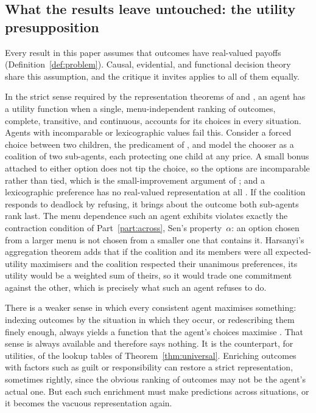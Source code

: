 \subsection{What the results leave untouched: the utility presupposition}\label{sec:disc-utility}

Every result in this paper assumes that outcomes have real-valued payoffs
(Definition~\ref{def:problem}). Causal, evidential, and functional decision theory share this
assumption, and the critique it invites applies to all of them equally.

In the strict sense required by the representation theorems of \textcite{vonneumannmorgenstern1944}
and \textcite{savage1954}, an agent has a utility function when a single, menu-independent ranking of
outcomes, complete, transitive, and continuous, accounts for its choices in every situation. Agents
with incomparable or lexicographic values fail this. Consider a forced choice between two children,
the predicament of \textcite{styron1979}, and model the chooser as a coalition of two sub-agents, each
protecting one child at any price. A small bonus attached to either option does not tip the choice,
so the options are incomparable rather than tied, which is the small-improvement argument of
\textcite{chang2002}; and a lexicographic preference has no real-valued representation at all
\autocite[159, with n.~1 on p.~164]{debreu1954}. If the coalition responds to deadlock by refusing, it brings about the outcome
both sub-agents rank last. The menu dependence such an agent exhibits violates exactly the contraction
condition  of Part~\ref{part:across}, Sen's property~$\alpha$: an option chosen from a larger
menu is not chosen from a smaller one that contains it. Harsanyi's aggregation theorem
\autocite[§III]{harsanyi1955} adds that if the coalition and its members were all expected-utility
maximisers and the coalition respected their unanimous preferences, its utility would be a weighted
sum of theirs, so it would trade one commitment against the other, which is precisely what such an
agent refuses to do.

There is a weaker sense in which every consistent agent maximises something: indexing outcomes by
the situation in which they occur, or redescribing them finely enough, always yields a function that
the agent's choices maximise \autocite[ch.~5]{broome1991}. That sense is always available and therefore says
nothing. It is the counterpart, for utilities, of the lookup tables of Theorem~\ref{thm:universal}.
Enriching outcomes with factors such as guilt or responsibility can restore a strict representation,
sometimes rightly, since the obvious ranking of outcomes may not be the agent's actual one. But each
such enrichment must make predictions across situations, or it becomes the vacuous representation
again.

